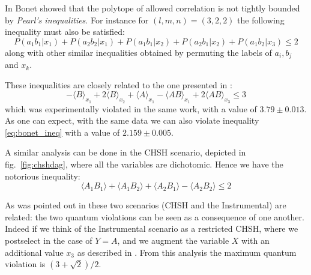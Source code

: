 \documentclass[floatfix, twocolumn, aps, prl]{revtex4-1}
\newcommand{\avg}[1]{\langle#1\rangle}
\begin{document}
In \cite{bonet2001} Bonet showed that the polytope of allowed
correlation is not tightly bounded by \emph{Pearl's inequalities}.
For instance for $(l,m,n) = (3,2,2)$ the following inequality must also be satisfied:
\begin{equation}
    P(a_1 b_1 | x_1) + P(a_2 b_2 | x_1) + 
    P(a_1 b_1 | x_2) + P(a_2 b_1 | x_2) + 
    P(a_1 b_2 | x_3) \le 2
    \label{eq:bonet_ineq}
\end{equation}
along with other similar inequalities obtained by permuting the labels of
$a_i,b_j$ and $x_k$.


These inequalities are closely related to the one presented in \cite{chaves2018}:
\begin{equation}
    -\avg{B}_{x_1} + 2 \avg{B}_{x_2} + \avg{A}_{x_1} - \avg{AB}_{x_1} +
    2\avg{AB}_{x_3} \le 3  
    \label{eq:rafael_ineq}
\end{equation}
which was experimentally violated in the same work, with a value of $3.79 \pm 0.013$.
As one can expect, with the same data we can also violate inequality
\eqref{eq:bonet_ineq} with a value of $2.159 \pm 0.005$.

A similar analysis can be done in the CHSH scenario, depicted in
fig.~\ref{fig:chshdag},
where all the variables are dichotomic.
Hence we have the notorious inequality:
\begin{equation}
    \avg{A_1B_1} + \avg{A_1B_2} + \avg{A_2B_1} - \avg{A_2B_2} \le 2
    \label{eq:chsh_ineq}
\end{equation}

As was pointed out in \cite{himbeeck2018} these two scenarios (CHSH and the Instrumental)
are related: the two quantum violations can be
seen as a consequence of one another.
Indeed if we think of the Instrumental scenario as a restricted CHSH,
where we postselect in the case of $Y = A$, and we augment the variable $X$ with
an additional value $x_3$ as described in \cite{himbeeck2018}.
From this analysis the maximum quantum violation is $(3 + \sqrt{2})/2$.
\end{document}
